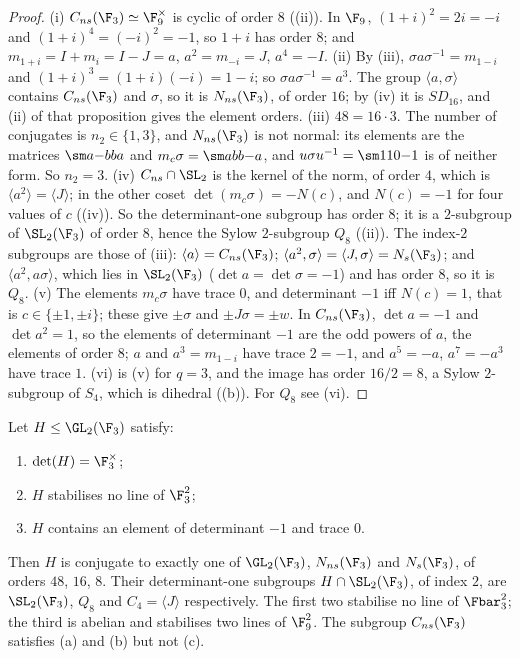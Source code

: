 \begin{proof}
(i) $C_{ns}(\F_3)\simeq\F_9^\times$ is cyclic of order $8$ ((ii)). In $\F_9$, $(1+i)^2=2i=-i$ and $(1+i)^4=(-i)^2=-1$, so $1+i$ has order $8$; and
$m_{1+i}=I+m_i=I-J=a$, $a^2=m_{-i}=J$, $a^4=-I$. (ii) By (iii), $\sigma a\sigma^{-1}=m_{1-i}$ and $(1+i)^3=(1+i)(-i)=1-i$; so $\sigma a\sigma^{-1}=a^3$. The group
$\langle a,\sigma\rangle$ contains $C_{ns}(\F_3)$ and $\sigma$, so it is $N_{ns}(\F_3)$, of order $16$; by (iv) it is $SD_{16}$, and (ii) of that
proposition gives the element orders. (iii) $48=16\cdot3$. The number of conjugates is $n_2\in\{1,3\}$, and $N_{ns}(\F_3)$ is not normal: its elements are the matrices
$\sm a{-b}ba$ and $m_c\sigma=\sm ab{b}{-a}$, and $u\sigma u^{-1}=\sm11{0}{-1}$ is of neither form. So $n_2=3$. (iv) $C_{ns}\cap\SL_2$ is the kernel of the norm, of order $4$, which
is $\langle a^2\rangle=\langle J\rangle$; in the other coset $\det(m_c\sigma)=-N(c)$, and $N(c)=-1$ for four values of $c$ ((iv)). So the
determinant-one subgroup has order $8$; it is a $2$-subgroup of $\SL_2(\F_3)$ of order $8$, hence the Sylow $2$-subgroup $Q_8$ ((ii)). The index-$2$
subgroups are those of (iii): $\langle a\rangle=C_{ns}(\F_3)$; $\langle a^2,\sigma\rangle=\langle J,\sigma\rangle=N_s(\F_3)$; and $\langle a^2,a\sigma\rangle$, which lies in $\SL_2(\F_3)$
($\det a=\det\sigma=-1$) and has order $8$, so it is $Q_8$. (v) The elements $m_c\sigma$ have trace $0$, and determinant $-1$ iff $N(c)=1$, that is $c\in\{\pm1,\pm i\}$; these give
$\pm\sigma$ and $\pm J\sigma=\pm w$. In $C_{ns}(\F_3)$, $\det a=-1$ and $\det a^2=1$, so the elements of determinant $-1$ are the odd powers of $a$, the elements of order $8$;
$a$ and $a^3=m_{1-i}$ have trace $2=-1$, and $a^5=-a$, $a^7=-a^3$ have trace $1$. (vi) is (v) for $q=3$, and the image has order $16/2=8$, a Sylow
$2$-subgroup of $S_4$, which is dihedral ((b)). For $Q_8$ see (vi).
\end{proof}

\begin{theorem}\label{thm:groups:threeimages}
Let $H\le\GL_2(\F_3)$ satisfy:
\begin{enumerate}[label=(\alph*)]
\item $\det(H)=\F_3^\times$;
\item $H$ stabilises no line of $\F_3^2$;
\item $H$ contains an element of determinant $-1$ and trace $0$.
\end{enumerate}
Then $H$ is conjugate to exactly one of $\GL_2(\F_3)$, $N_{ns}(\F_3)$ and $N_s(\F_3)$, of orders $48$, $16$, $8$. Their determinant-one subgroups $H\cap\SL_2(\F_3)$,
of index $2$, are $\SL_2(\F_3)$, $Q_8$ and $C_4=\langle J\rangle$ respectively. The first two stabilise no line of $\Fbar_3^2$; the third is abelian and stabilises two lines of
$\F_9^2$. The subgroup $C_{ns}(\F_3)$ satisfies (a) and (b) but not (c).
\end{theorem}

